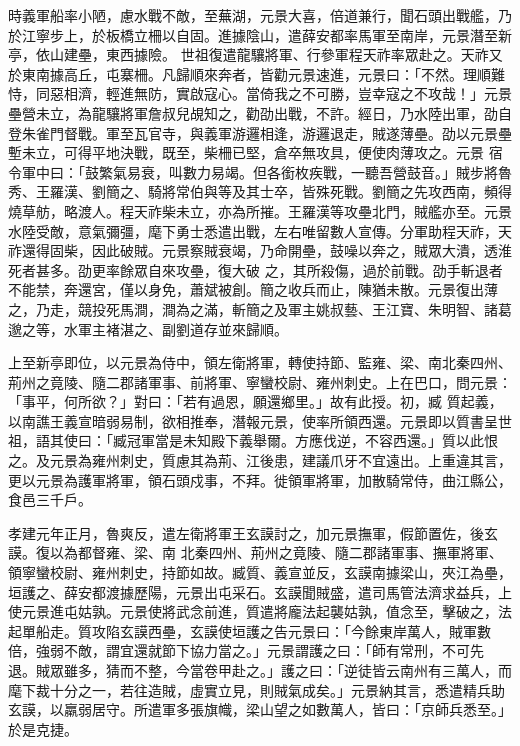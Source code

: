 \begin{pinyinscope}
 時義軍船率小陋，慮水戰不敵，至蕪湖，元景大喜，倍道兼行，聞石頭出戰艦，乃於江寧步上，於板橋立柵以自固。進據陰山，遣薛安都率馬軍至南岸，元景潛至新亭，依山建壘，東西據險。
 世祖復遣龍驤將軍、行參軍程天祚率眾赴之。天祚又於東南據高丘，屯寨柵。凡歸順來奔者，皆勸元景速進，元景曰：「不然。理順難恃，同惡相濟，輕進無防，實啟寇心。當倚我之不可勝，豈幸寇之不攻哉！」元景壘營未立，為龍驤將軍詹叔兒覘知之，勸劭出戰，不許。經日，乃水陸出軍，劭自登朱雀門督戰。軍至瓦官寺，與義軍游邏相逢，游邏退走，賊遂薄壘。劭以元景壘塹未立，可得平地決戰，既至，柴柵已堅，倉卒無攻具，便使肉薄攻之。元景
 宿令軍中曰：「鼓繁氣易衰，叫數力易竭。但各銜枚疾戰，一聽吾營鼓音。」賊步將魯秀、王羅漢、劉簡之、騎將常伯與等及其士卒，皆殊死戰。劉簡之先攻西南，頻得燒草舫，略渡人。程天祚柴未立，亦為所摧。王羅漢等攻壘北門，賊艦亦至。元景水陸受敵，意氣彌彊，麾下勇士悉遣出戰，左右唯留數人宣傳。分軍助程天祚，天祚還得固柴，因此破賊。元景察賊衰竭，乃命開壘，鼓噪以奔之，賊眾大潰，透淮死者甚多。劭更率餘眾自來攻壘，復大破
 之，其所殺傷，過於前戰。劭手斬退者不能禁，奔還宮，僅以身免，蕭斌被創。簡之收兵而止，陳猶未散。元景復出薄之，乃走，競投死馬澗，澗為之滿，斬簡之及軍主姚叔藝、王江寶、朱明智、諸葛邈之等，水軍主褚湛之、副劉道存並來歸順。



 上至新亭即位，以元景為侍中，領左衛將軍，轉使持節、監雍、梁、南北秦四州、荊州之竟陵、隨二郡諸軍事、前將軍、寧蠻校尉、雍州刺史。上在巴口，問元景：「事平，何所欲？」對曰：「若有過恩，願還鄉里。」故有此授。初，臧
 質起義，以南譙王義宣暗弱易制，欲相推奉，潛報元景，使率所領西還。元景即以質書呈世祖，語其使曰：「臧冠軍當是未知殿下義舉爾。方應伐逆，不容西還。」質以此恨之。及元景為雍州刺史，質慮其為荊、江後患，建議爪牙不宜遠出。上重違其言，更以元景為護軍將軍，領石頭戍事，不拜。徙領軍將軍，加散騎常侍，曲江縣公，食邑三千戶。



 孝建元年正月，魯爽反，遣左衛將軍王玄謨討之，加元景撫軍，假節置佐，後玄謨。復以為都督雍、梁、南
 北秦四州、荊州之竟陵、隨二郡諸軍事、撫軍將軍、領寧蠻校尉、雍州刺史，持節如故。臧質、義宣並反，玄謨南據梁山，夾江為壘，垣護之、薛安都渡據歷陽，元景出屯采石。玄謨聞賊盛，遣司馬管法濟求益兵，上使元景進屯姑孰。元景使將武念前進，質遣將龐法起襲姑孰，值念至，擊破之，法起單船走。質攻陷玄謨西壘，玄謨使垣護之告元景曰：「今餘東岸萬人，賊軍數倍，強弱不敵，謂宜還就節下協力當之。」元景謂護之曰：「師有常刑，不可先
 退。賊眾雖多，猜而不整，今當卷甲赴之。」護之曰：「逆徒皆云南州有三萬人，而麾下裁十分之一，若往造賊，虛實立見，則賊氣成矣。」元景納其言，悉遣精兵助玄謨，以羸弱居守。所遣軍多張旗幟，梁山望之如數萬人，皆曰：「京師兵悉至。」於是克捷。




\end{pinyinscope}
